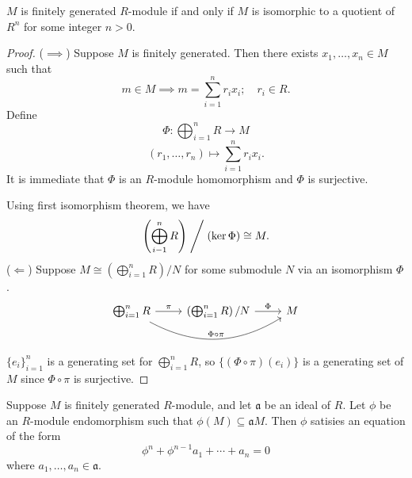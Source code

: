 \begin{proposition}
    \(M\) is finitely generated  \(R\)-module if and only if  \(M\) is isomorphic to a quotient of  \(R^n\) for some  integer \(n > 0\).
\end{proposition}
\begin{proof}
(\(\implies\)) Suppose \(M\) is finitely generated. Then there exists \(x_1, \ldots, x_n \in M\) such that 
\[
    m \in M \implies m = \sum_{i=1}^{n} r_i x_i; \quad r_i \in R.
\] 
Define
\[
    \Phi: \bigoplus_{i=1}^n R \longrightarrow M 
\]
\[
    (r_1, \ldots, r_n) \mapsto \sum_{i=1}^{n} r_i x_i.
\] 
It is immediate that \(\Phi\) is an  \(R\)-module homomorphism and \(\Phi\) is surjective. 

Using first isomorphism theorem, we have
\[
    \left(\bigoplus_{i-1}^n R\right) \Biggm/ (\ker \Phi) \cong M.
\] 
(\(\Longleftarrow\)) Suppose \(M \cong \left(\bigoplus_{i=1}^n R\right)/N\) for some submodule \(N\) via an isomorphism  \(\Phi\). 
\[\begin{tikzcd}
	{\bigoplus_{i=1}^nR} & {\left(\bigoplus_{i=1}^n R\right)/N} & M
	\arrow["\pi", from=1-1, to=1-2]
\arrow["{\Phi \circ \pi}", bend right, from=1-1, to=1-3]
	\arrow["\Phi", from=1-2, to=1-3]
\end{tikzcd}\]
\(\{e_i\}_{i=1}^n\) is a generating set for \(\bigoplus_{i=1}^n R\), so  \(\{(\Phi \circ \pi)(e_i)\}\) is a generating set of \(M\) since \(\Phi \circ \pi\) is surjective. 
\end{proof}
\begin{proposition}\label{prop:fingeneratedmodpoly}
    Suppose \(M\) is finitely generated \(R\)-module, and let \(\mathfrak{a}\) be an ideal of \(R\). Let \(\phi\) be an \(R\)-module endomorphism such that \(\phi(M) \subseteq \mathfrak{a} M\). Then \(\phi\) satisies an equation of the form \[\phi^n + \phi^{n-1} a_1 + \cdots + a_n = 0\]
    where \(a_1, \ldots, a_n \in \mathfrak{a}\). 
\end{proposition}
